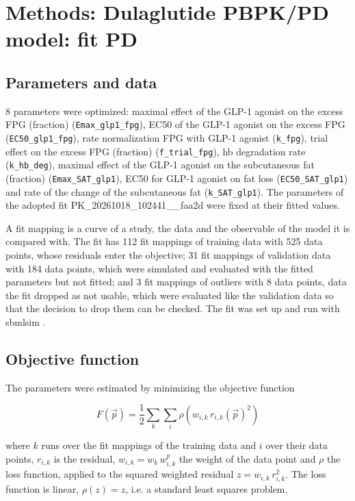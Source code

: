\section{Methods: Dulaglutide PBPK/PD model: fit PD}

\subsection{Parameters and data}

8 parameters were optimized: maximal effect of the GLP-1 agonist on the excess FPG (fraction) (\texttt{Emax\_glp1\_fpg}), EC50 of the GLP-1 agonist on the excess FPG (\texttt{EC50\_glp1\_fpg}), rate normalization FPG with GLP-1 agonist (\texttt{k\_fpg}), trial effect on the excess FPG (fraction) (\texttt{f\_trial\_fpg}), hb degradation rate (\texttt{k\_hb\_deg}), maximal effect of the GLP-1 agonist on the subcutaneous fat (fraction) (\texttt{Emax\_SAT\_glp1}), EC50 for GLP-1 agonist on fat loss (\texttt{EC50\_SAT\_glp1}) and rate of the change of the subcutaneous fat (\texttt{k\_SAT\_glp1}). The parameters of the adopted fit PK\_20261018\_102441\_\_faa2d were fixed at their fitted values.

A fit mapping is a curve of a study, the data and the observable of the model it is compared with. The fit has 112 fit mappings of training data with 525 data points, whose residuals enter the objective; 31 fit mappings of validation data with 184 data points, which were simulated and evaluated with the fitted parameters but not fitted; and 3 fit mappings of outliers with 8 data points, data the fit dropped as not usable, which were evaluated like the validation data so that the decision to drop them can be checked. The fit was set up and run with sbmlsim \cite{Koenig2026_sbmlsim}.

\subsection{Objective function}

The parameters were estimated by minimizing the objective function

\begin{equation}
F(\vec{p}) = \frac{1}{2} \sum_{k} \sum_{i} \rho\left(w_{i,k}\, r_{i,k}(\vec{p})^2\right)
\end{equation}

where $k$ runs over the fit mappings of the training data and $i$ over their data points, $r_{i,k}$ is the residual, $w_{i,k} = w_k\, w^{p}_{i,k}$ the weight of the data point and $\rho$ the loss function, applied to the squared weighted residual $z = w_{i,k}\, r_{i,k}^2$. The loss function is linear, $\rho(z) = z$, i.e. a standard least squares problem.

